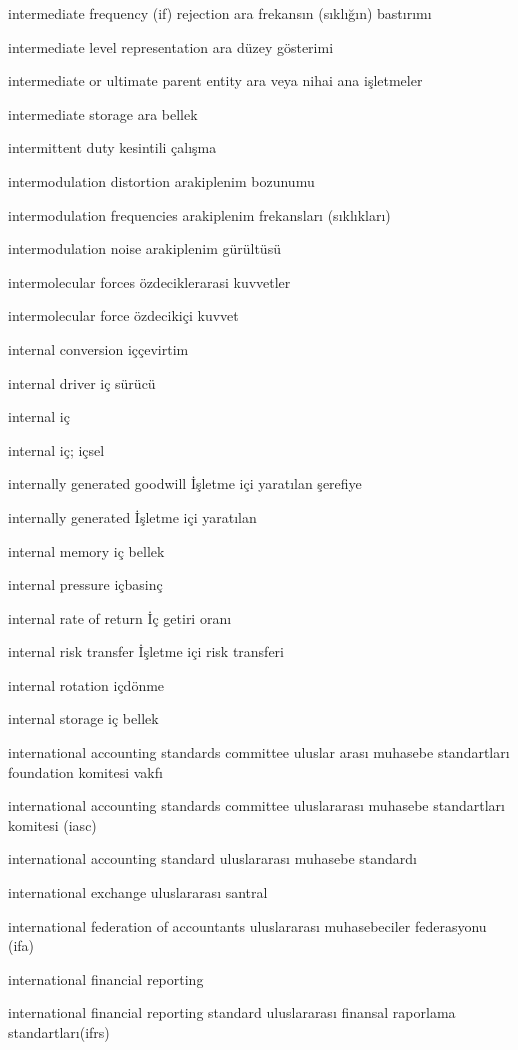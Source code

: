 \documentclass[12pt,fleqn]{article}\usepackage{../../common}
\begin{document}
intermediate frequency (if) rejection ara frekansın (sıklığın) bastırımı

intermediate level representation ara düzey gösterimi

intermediate or ultimate parent entity ara veya nihai ana işletmeler

intermediate storage ara bellek

intermittent duty kesintili çalışma

intermodulation distortion arakiplenim bozunumu

intermodulation frequencies arakiplenim frekansları (sıklıkları)

intermodulation noise arakiplenim gürültüsü

intermolecular forces özdeciklerarasi kuvvetler

intermolecular force özdecikiçi kuvvet

internal conversion iççevirtim

internal driver iç sürücü

internal iç

internal iç; içsel

internally generated goodwill İşletme içi yaratılan şerefiye

internally generated İşletme içi yaratılan

internal memory iç bellek

internal pressure içbasinç

internal rate of return İç getiri oranı

internal risk transfer İşletme içi risk transferi

internal rotation içdönme

internal storage iç bellek

international accounting standards committee uluslar arası muhasebe standartları foundation komitesi vakfı

international accounting standards committee uluslararası muhasebe standartları komitesi (iasc)

international accounting standard uluslararası muhasebe standardı

international exchange uluslararası santral

international federation of accountants uluslararası muhasebeciler federasyonu (ifa)

international financial reporting

international financial reporting standard uluslararası finansal raporlama standartları(ifrs)
\end{document}
